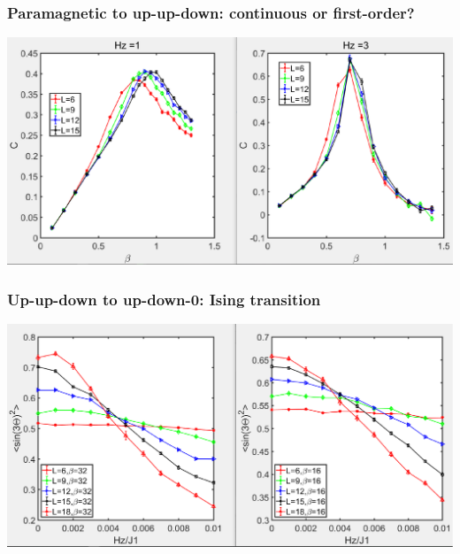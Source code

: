 \documentclass[xcolor=table, aspectratio=1610,ignorenonframetext]{beamer}
\begin{document}
\begin{frame}
  \frametitle{Paramagnetic to up-up-down: continuous or first-order?}
  \begin{center}
    \includegraphics[width=.8\textwidth]{cv-potts-fo}
  \end{center}
\end{frame}

\begin{frame}
  \frametitle{Up-up-down to up-down-0: Ising transition}
  \begin{center}
    \includegraphics[width=.8\textwidth]{z2-cross}
  \end{center}
\end{frame}
\end{document}

